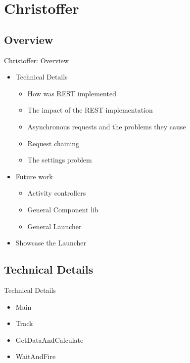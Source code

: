 \section{Christoffer}
\subsection{Overview}

\begin{frame}{Christoffer: Overview}
\begin{itemize}
  \item Technical Details
  		\begin{itemize}
  			\item How was REST implemented
  			\item The impact of the REST implementation
  			\item Asynchronous requests and the problems they cause
  			\item Request chaining
  			\item The settings problem	  
		\end{itemize}
  \item Future work
  		\begin{itemize}
  			\item Activity controllers
  			\item General Component lib
  			\item General Launcher
		\end{itemize}
  \item Showcase the Launcher
\end{itemize}
\end{frame}

\subsection{Technical Details}
\begin{frame}{Technical Details}
\begin{itemize}
  \item Main
  \item Track
  \item GetDataAndCalculate
  \item WaitAndFire
\end{itemize}
\end{frame}

